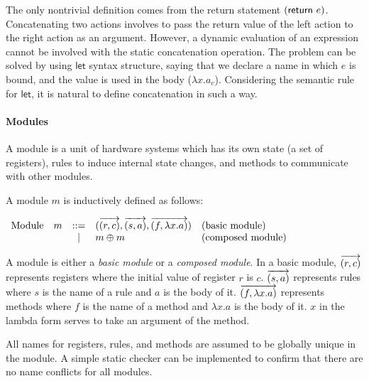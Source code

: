 The only nontrivial definition comes from the return statement
$(\textsf{return}\ {} e)$. Concatenating two actions involves to pass the return
value of the left action to the right action as an argument. However,
a dynamic evaluation of an expression cannot be involved with the
static concatenation operation. The problem can be solved by using
$\textsf{let}$ syntax structure, saying that we declare a name in
which $e$ is bound, and the value is used in the body ($\lambda
x.a_c$). Considering the semantic rule for $\textsf{let}$, it is
natural to define concatenation in such a way.

\paragraph{Modules}
A module is a unit of hardware systems which has its own state (a set
of registers), rules to induce internal state changes, and methods to
communicate with other modules.

\begin{definition}
  \label{def-module}
  A module $m$ is inductively defined as follows:
  \begin{center}
    \begin{math}
      \begin{array}{rcll}
        \textrm{Module}\quad m & ::=
        & (\overrightarrow{(r, c)}, \overrightarrow{(s, a)}, \overrightarrow{(f, \lambda x.a)})
        & \textrm{(basic module)} \\
        & | & m \oplus m & \textrm{(composed module)}
      \end{array}
    \end{math}
  \end{center}
\end{definition}

A module is either a \emph{basic module} or a \emph{composed module}.
In a basic module, $\overrightarrow{(r, c)}$ represents registers
where the initial value of register $r$ is $c$.
$\overrightarrow{(s, a)}$ represents rules where $s$ is the name of a
rule and $a$ is the body of it. $\overrightarrow{(f, \lambda x.a)}$
represents methods where $f$ is the name of a method and $\lambda x.a$
is the body of it. $x$ in the lambda form serves to take an argument
of the method.

All names for registers, rules, and methods are assumed to be globally
unique in the module. A simple static checker can be implemented to
confirm that there are no name conflicts for all modules.

